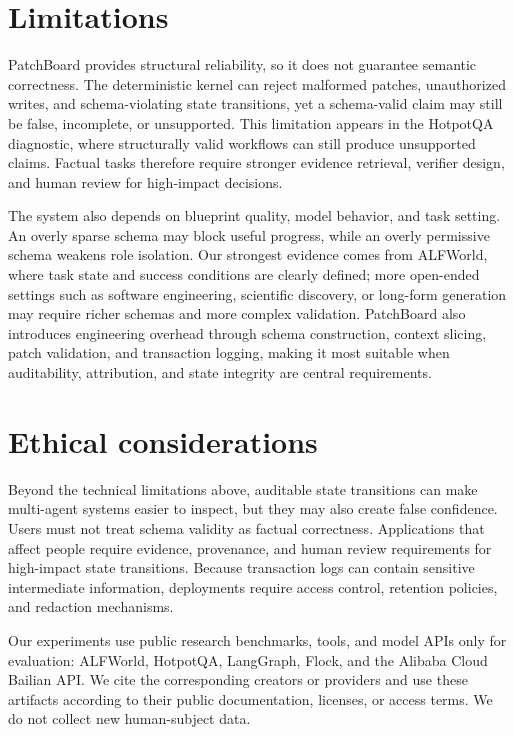 \documentclass[11pt]{article}
\newcommand{\method}{PatchBoard}
\begin{document}
\section*{Limitations}
\label{sec:limitations}

\method{} provides structural reliability, so it does not guarantee semantic correctness. The deterministic kernel can reject malformed patches, unauthorized writes, and schema-violating state transitions, yet a schema-valid claim may still be false, incomplete, or unsupported. This limitation appears in the HotpotQA diagnostic, where structurally valid workflows can still produce unsupported claims. Factual tasks therefore require stronger evidence retrieval, verifier design, and human review for high-impact decisions.

The system also depends on blueprint quality, model behavior, and task setting. An overly sparse schema may block useful progress, while an overly permissive schema weakens role isolation. Our strongest evidence comes from ALFWorld, where task state and success conditions are clearly defined; more open-ended settings such as software engineering, scientific discovery, or long-form generation may require richer schemas and more complex validation. \method{} also introduces engineering overhead through schema construction, context slicing, patch validation, and transaction logging, making it most suitable when auditability, attribution, and state integrity are central requirements.

\section*{Ethical considerations}

Beyond the technical limitations above, auditable state transitions can make multi-agent systems easier to inspect, but they may also create false confidence. Users must not treat schema validity as factual correctness. Applications that affect people require evidence, provenance, and human review requirements for high-impact state transitions. Because transaction logs can contain sensitive intermediate information, deployments require access control, retention policies, and redaction mechanisms.

Our experiments use public research benchmarks, tools, and model APIs only for evaluation: ALFWorld, HotpotQA, LangGraph, Flock, and the Alibaba Cloud Bailian API. We cite the corresponding creators or providers and use these artifacts according to their public documentation, licenses, or access terms. We do not collect new human-subject data.
\end{document}
